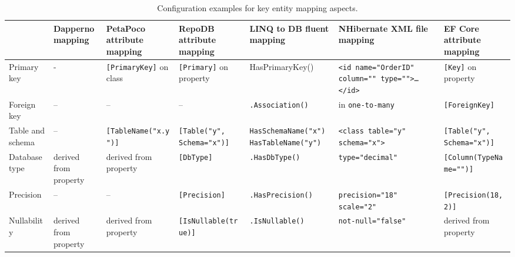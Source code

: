 \begin{landscape}
\begin{table}
\centering
\caption{Configuration examples for key entity mapping aspects.}
\label{tab:entity_mapping}
\scriptsize
\def\arraystretch{1.35}
\begin{tabular}{
>{\raggedright\arraybackslash}p{20.00mm}
>{\arraybackslash}p{30.00mm}
>{\arraybackslash}p{30.00mm}
>{\arraybackslash}p{30.00mm}
>{\arraybackslash}p{30.00mm}
>{\arraybackslash}p{40.00mm}
>{\arraybackslash}p{30.00mm}
}
\toprule
  &    \textbf{Dapper}\newline no mapping &  \textbf{PetaPoco} \newline attribute mapping &    \textbf{RepoDB} \newline attribute mapping &   \textbf{LINQ to DB} \newline fluent mapping & \textbf{NHibernate} \newline XML file mapping  &   \textbf{EF Core} \newline attribute mapping \\
\midrule
Primary key  & - & \texttt{[PrimaryKey]} on class & \texttt{[Primary]} on property & HasPrimaryKey() & \texttt{<id name="OrderID" column="" type="">\ldots</id>} & \texttt{[Key]} on property \\

\midrule
Foreign key & – & – & – & \texttt{.Association()}  & in \texttt{one-to-many} & \texttt{[ForeignKey]} \\

\midrule
Table and schema &
– &
\texttt{[TableName("x.y")]} &
\texttt{[Table("y", Schema="x")]} &
\texttt{HasSchemaName("x")} \newline \texttt{HasTableName("y")} &
\texttt{<class table="y" schema="x">} &
\texttt{[Table("y", Schema="x")]} \\

\midrule
Database type & derived from property & derived from property & \texttt{[DbType]} & \texttt{.HasDbType()} & \texttt{type="decimal"} & \texttt{[Column(TypeName="")]} \\

\midrule
Precision & – & – & \texttt{[Precision]} & \texttt{.HasPrecision()} & \texttt{precision="18" scale="2"} & \texttt{[Precision(18,2)]} \\

\midrule
Nullability & derived from property & derived from property & \texttt{[IsNullable(true)]} & \texttt{.IsNullable()} & \texttt{not-null="false"} & derived from property \\


\end{tabular}
\end{table}
\end{landscape}
